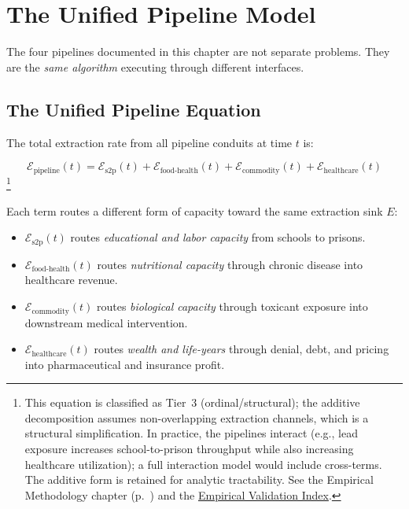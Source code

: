 \section{The Unified Pipeline Model}
\label{sec:unified_pipeline}

The four pipelines documented in this chapter are not separate problems. They are the \textit{same algorithm} executing through different interfaces.

\subsection{The Unified Pipeline Equation}

The total extraction rate from all pipeline conduits at time $t$ is:

\begin{equation}\label{eq:unified-pipeline}
\mathcal{E}_{\text{pipeline}}(t) = \mathcal{E}_{\text{s2p}}(t) + \mathcal{E}_{\text{food-health}}(t) + \mathcal{E}_{\text{commodity}}(t) + \mathcal{E}_{\text{healthcare}}(t)
\end{equation}
\footnote{This equation is classified as Tier~3 (ordinal/structural); the additive decomposition assumes non-overlapping extraction channels, which is a structural simplification. In practice, the pipelines interact (e.g., lead exposure increases school-to-prison throughput while also increasing healthcare utilization); a full interaction model would include cross-terms. The additive form is retained for analytic tractability. See the Empirical Methodology chapter (p.~\pageref{ch:empirical_methodology}) and the \hyperref[app:empirical_index]{Empirical Validation Index}.}

Each term routes a different form of capacity toward the same extraction sink $E$:
\begin{itemize}[leftmargin=2em]
    \item $\mathcal{E}_{\text{s2p}}(t)$ routes \textit{educational and labor capacity} from schools to prisons.
    \item $\mathcal{E}_{\text{food-health}}(t)$ routes \textit{nutritional capacity} through chronic disease into healthcare revenue.
    \item $\mathcal{E}_{\text{commodity}}(t)$ routes \textit{biological capacity} through toxicant exposure into downstream medical intervention.
    \item $\mathcal{E}_{\text{healthcare}}(t)$ routes \textit{wealth and life-years} through denial, debt, and pricing into pharmaceutical and insurance profit.
\end{itemize}

